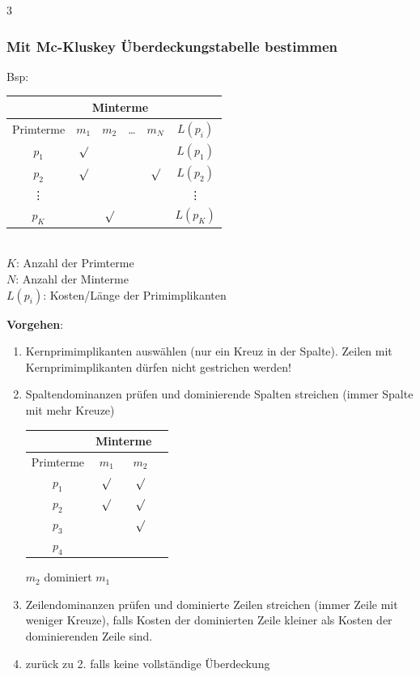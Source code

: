 \documentclass[6pt,a4paper]{scrartcl}
\begin{document}
\begin{multicols*}{3}
	\subsubsection{Mit Mc-Kluskey Überdeckungstabelle bestimmen} Bsp:\\
	\begin{tabular}{|c|c|c|c|c|c|}
		\hline
		          & \multicolumn{4}{c|}{Minterme} &                                      \\ \hline
		Primterme & $m_1$                         & $m_2$   & \dots & $m_N$   & $L(p_i)$ \\ \bottomrule[1pt]
		$p_1$     & $\surd$                       &         &       &         & $L(p_1)$ \\ \hline
		$p_2$     & $\surd$                       &         &       & $\surd$ & $L(p_2)$ \\ \hline
		\vdots    &                               &         &       &         & \vdots   \\ \hline
		$p_K$     &                               & $\surd$ &       &         & $L(p_K)$ \\ \hline
	\end{tabular} \\
	$K$: Anzahl der Primterme\\
	$N$: Anzahl der Minterme \\
	$L(p_i)$: Kosten/Länge der Primimplikanten \vspace{0.1cm}
	\begin{sectionbox}
		\textbf{Vorgehen}:
		\begin{enumerate}
			\item Kernprimimplikanten auswählen (nur ein Kreuz in der Spalte). Zeilen mit Kernprimimplikanten dürfen nicht gestrichen werden!
			\item Spaltendominanzen prüfen und dominierende Spalten streichen (immer Spalte mit mehr Kreuze)\\
			      \begin{tabular}{|c|c|c|c|}
				      \hline
				                & \multicolumn{2}{c|}{Minterme} &         \\ \hline
				      Primterme & $m_1$                         & $m_2$   \\ \bottomrule[1pt]
				      $p_1$     & $\surd$                       & $\surd$ \\ \hline
				      $p_2$     & $\surd$                       & $\surd$ \\ \hline
				      $p_3$     &                               & $\surd$ \\ \hline
				      $p_4$     &                               &         \\ \hline
			      \end{tabular}
			      $m_2$ dominiert $m_1$
			\item Zeilendominanzen prüfen und dominierte Zeilen streichen (immer Zeile mit weniger Kreuze), falls Kosten der dominierten Zeile kleiner als Kosten der dominierenden Zeile sind.
			\item zurück zu 2. falls keine vollständige Überdeckung
		\end{enumerate}
	\end{sectionbox}


\end{multicols*}
\end{document}
